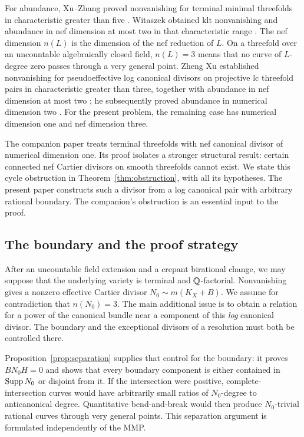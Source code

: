 For abundance, Xu--Zhang proved nonvanishing for terminal minimal
threefolds in characteristic greater than five \cite{XZ}. Witaszek
obtained klt nonvanishing and abundance in nef dimension at most two
in that characteristic range \cite{Witaszek}. The nef dimension $n(L)$
is the dimension of the nef reduction of $L$. On a threefold over an
uncountable algebraically closed field, $n(L)=3$ means that no curve of $L$-degree zero passes
through a very general point. Zheng Xu established nonvanishing for pseudoeffective log
canonical divisors on projective lc threefold pairs in characteristic
greater than three, together with
abundance in nef dimension at most two
\cite[Theorems~1.4 and~1.8]{XuNonvanishing}; he subsequently proved
abundance in numerical dimension two \cite[Theorem~1.1]{XuNuTwo}.
For the present problem, the remaining case has numerical dimension
one and nef dimension three.

The companion paper \cite{Companion} treats terminal threefolds with
nef canonical divisor of numerical dimension one. Its proof isolates
a stronger structural result: certain connected nef Cartier divisors
on smooth threefolds cannot exist. We state this cycle obstruction
in Theorem~\ref{thm:obstruction}, with all its hypotheses. The present
paper constructs such a divisor from a log canonical pair with
arbitrary rational boundary. The companion's obstruction is an
essential input to the proof.

\subsection*{The boundary and the proof strategy}

After an uncountable field extension and a crepant birational change,
we may suppose that the underlying variety is terminal and
$\mathbb Q$-factorial. Nonvanishing gives a nonzero effective Cartier divisor
$N_0\sim m(K_X+B)$. We assume for contradiction that $n(N_0)=3$.
The main additional issue is to obtain a relation for a power of the
canonical bundle near a component of this \emph{log} canonical divisor.
The boundary and the exceptional divisors of a resolution must both
be controlled there.

Proposition~\ref{prop:separation} supplies that control for the boundary:
it proves $BN_0H=0$ and shows that every boundary component is either
contained in $\operatorname{Supp} N_0$ or disjoint from it. If the intersection were
positive, complete-intersection curves would have arbitrarily small
ratios of $N_0$-degree to anticanonical degree. Quantitative
bend-and-break \cite[Theorem~1.1]{JLR} would then produce
$N_0$-trivial rational curves through very general points. This
separation argument is formulated independently of the MMP.

